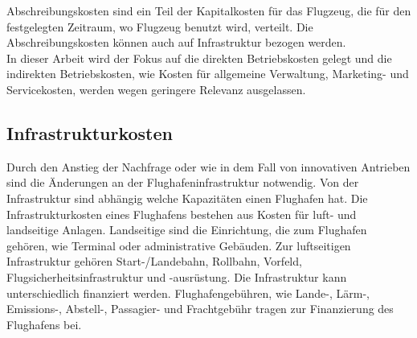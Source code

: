 Abschreibungskosten sind ein Teil der Kapitalkosten für das Flugzeug, die für den festgelegten Zeitraum, wo Flugzeug benutzt wird, verteilt.
Die Abschreibungskosten können auch auf Infrastruktur bezogen werden.\\
%
%
%
In dieser Arbeit wird der Fokus auf die direkten Betriebskosten gelegt und die indirekten Betriebskosten, wie Kosten für 
allgemeine Verwaltung, Marketing- und Servicekosten, werden wegen geringere Relevanz ausgelassen.\\
%
\subsection{Infrastrukturkosten}
%
Durch den Anstieg der Nachfrage oder wie in dem Fall von innovativen Antrieben sind die Änderungen an der Flughafeninfrastruktur notwendig.
Von der Infrastruktur sind abhängig welche Kapazitäten einen Flughafen hat.
Die Infrastrukturkosten eines Flughafens bestehen aus Kosten für luft- und landseitige Anlagen. Landseitige sind die Einrichtung, die zum Flughafen
gehören, wie Terminal oder administrative Gebäuden. Zur luftseitigen Infrastruktur gehören Start-/Landebahn, Rollbahn, Vorfeld, 
Flugsicherheitsinfrastruktur und -ausrüstung. Die Infrastruktur kann unterschiedlich finanziert werden.
Flughafengebühren, wie Lande-, Lärm-, Emissions-, Abstell-, Passagier- und Frachtgebühr tragen zur Finanzierung des Flughafens bei.%

